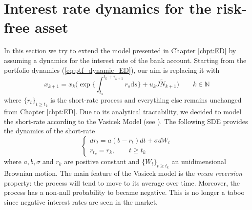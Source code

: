 \section{Interest rate dynamics for the risk-free asset}\label{sec:Interest_rate_dynamics}
In this section we try to extend the model presented in Chapter \ref{chpt:ED} by assuming a dynamics for the interest rate of the bank account. Starting from the portfolio dynamics (\ref{eq:ptf_dynamic_ED}), our aim is replacing it with
\begin{equation}\label{eq:portfolio_dynamic_Vasicek}
\boxed{x_{k+1} = x_k\big( \exp\Big\{\int_{t_k}^{t_k+\tau_{k+1}}\!\!\!\!\!\!\!\!r_s\mathrm{d}s \Big\} + u_kJ\widetilde{N}_{k+1}\big)} \qquad k \in \mathbb{N}
\end{equation}
where $\{r_t\}_{t\geq t_k}$ is the short-rate process and everything else remains unchanged from Chapter \ref{chpt:ED}. Due to its analytical tractability, we decided to model the short-rate according to the Vasicek Model (see \cite{brigo2007}). The following \gls{SDE} provides the dynamics of the short-rate
\begin{equation}\label{eq:VasicekSDE}
\begin{cases*}
dr_t = a(b-r_t)dt + \sigma dW_t\\
r_{t_k} = r_k, \qquad t \geq t_k
\end{cases*}
\end{equation}
where $a,b,\sigma$ and $r_k$ are positive constant and $\{W_t\}_{t\geq t_k}$ an unidimensional Brownian motion. The main feature of the Vasicek model is the \textit{mean reversion} property: the process will tend to move to its average over time. Moreover, the process has a non-null probability to became negative. This is no longer a taboo since negative interest rates are seen in the market.

